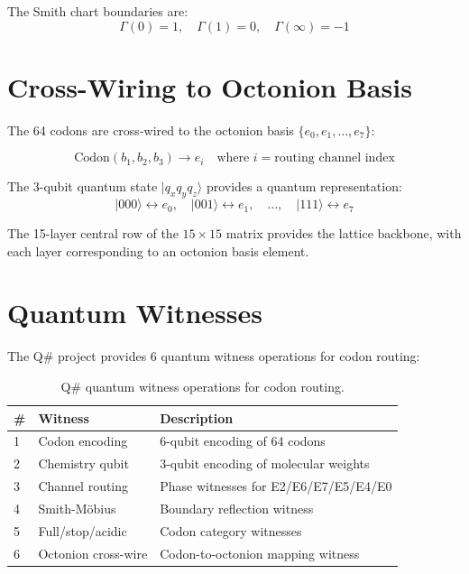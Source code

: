 \documentclass[11pt]{article}
\begin{document}
The Smith chart boundaries are:
\begin{equation}
\Gamma(0) = 1, \quad \Gamma(1) = 0, \quad \Gamma(\infty) = -1
\end{equation}

\section{Cross-Wiring to Octonion Basis}

The 64 codons are cross-wired to the octonion basis $\{e_0, e_1, \ldots, e_7\}$:

\begin{equation}
\text{Codon}(b_1, b_2, b_3) \to e_i \quad \text{where } i = \text{routing channel index}
\end{equation}

The 3-qubit quantum state $|q_x q_y q_z\rangle$ provides a quantum representation:
\begin{equation}
|000\rangle \leftrightarrow e_0, \quad |001\rangle \leftrightarrow e_1, \quad \ldots, \quad |111\rangle \leftrightarrow e_7
\end{equation}

The 15-layer central row of the $15 \times 15$ matrix provides the lattice backbone, with each layer corresponding to an octonion basis element.

\section{Quantum Witnesses}

The Q\# project provides 6 quantum witness operations for codon routing:

\begin{table}[ht]
\centering
\caption{Q\# quantum witness operations for codon routing.}
\label{tab:qsharp}
\begin{tabular}{llp{7cm}}
\toprule
\# & Witness & Description \\
\midrule
1 & Codon encoding & 6-qubit encoding of 64 codons \\
2 & Chemistry qubit & 3-qubit encoding of molecular weights \\
3 & Channel routing & Phase witnesses for E2/E6/E7/E5/E4/E0 \\
4 & Smith-M\"obius & Boundary reflection witness \\
5 & Full/stop/acidic & Codon category witnesses \\
6 & Octonion cross-wire & Codon-to-octonion mapping witness \\
\bottomrule
\end{tabular}
\end{table}
\end{document}
